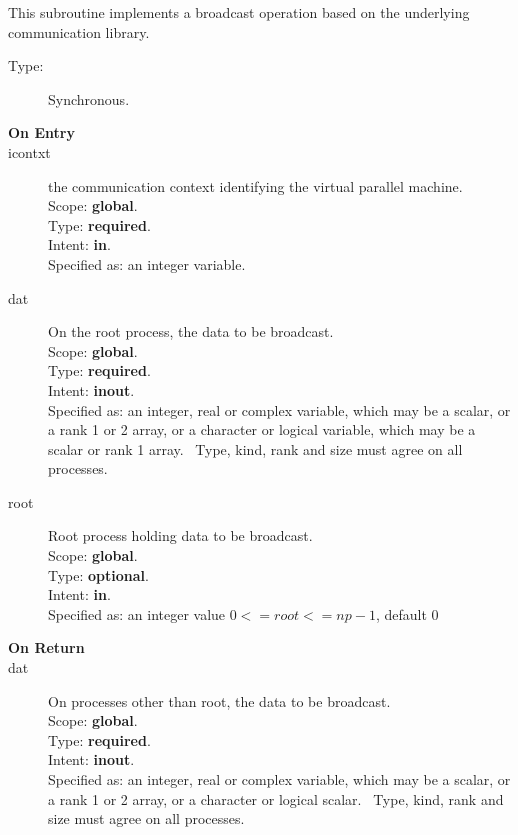 

This subroutine implements a broadcast operation based on the
underlying communication library. 
\begin{description}
\item[Type:] Synchronous.
\item[\bf  On Entry ]
\item[icontxt] the communication context identifying the virtual
  parallel machine.\\
Scope: {\bf global}.\\
Type: {\bf required}.\\
Intent: {\bf in}.\\
Specified as: an integer variable.
\item[dat] On the root process, the data to be broadcast.\\
Scope: {\bf global}.\\
Type: {\bf required}.\\
Intent: {\bf inout}.\\
Specified as: an integer, real or complex variable, which may be a
scalar, or a rank 1 or 2 array, or a character or logical variable,
which may be a scalar or rank 1 array. \
Type, kind, rank and size must agree on all processes.
\item[root] Root process holding data to be broadcast.\\
Scope: {\bf global}.\\
Type: {\bf optional}.\\
Intent: {\bf in}.\\
Specified as: an integer value $0<= root <= np-1$, default 0 \
\end{description}


\begin{description}
\item[\bf On Return]
\item[dat] On processes other than  root, the data to be broadcast.\\
Scope: {\bf global}.\\
Type: {\bf required}.\\
Intent: {\bf inout}.\\
Specified as: an integer, real or complex variable, which may be a
scalar, or a rank 1 or 2 array, or a character or logical scalar. \
Type, kind, rank and size must agree on all processes.
\end{description}


